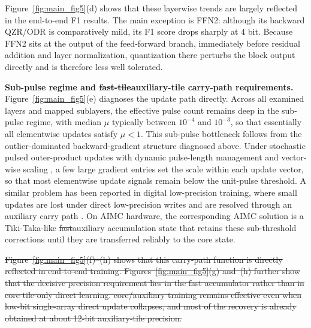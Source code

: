 \documentclass[AMA,LATO2COL]{WileyNJDv5}
\newcommand{\old}[1]{\sout{#1}}
\newcommand{\new}[1]{{\color{red}#1}}
\begin{document}
\noindent
Figure~\ref{fig:main_fig5}(d) shows that these layerwise trends are largely reflected in the end-to-end F1 results. The main exception is FFN2: although its backward QZR/ODR is comparatively mild, its F1 score drops sharply at 4 bit. Because FFN2 sits at the output of the feed-forward branch, immediately before residual addition and layer normalization, quantization there perturbs the block output directly and is therefore less well tolerated.

\noindent\textbf{Sub-pulse regime and \old{fast-tile}\new{auxiliary-tile} carry-path requirements.}
Figure~\ref{fig:main_fig5}(e) diagnoses the update path directly. Across all examined layers and mapped sublayers, the effective pulse count remains deep in the sub-pulse regime, with median \(\mu\) typically between \(10^{-4}\) and \(10^{-3}\), so that essentially all elementwise updates satisfy \(\mu < 1\). This sub-pulse bottleneck follows from the outlier-dominated backward-gradient structure diagnosed above. Under stochastic pulsed outer-product updates with dynamic pulse-length management and vector-wise scaling \cite{rasch2021aihwkit,legallo2023aihwkit}, a few large gradient entries set the scale within each update vector, so that most elementwise update signals remain below the unit-pulse threshold. A similar problem has been reported in digital low-precision training, where small updates are lost under direct low-precision writes and are resolved through an auxiliary carry path \cite{nikdan2026eco}. On AIMC hardware, the corresponding AIMC solution is a Tiki-Taka-like \old{fast}\new{auxiliary} accumulation state that retains these sub-threshold corrections until they are transferred reliably to the core state. 

\noindent
\old{Figure~\ref{fig:main_fig5}(f)--(h) shows that this carry-path function is directly reflected in end-to-end training. Figures~\ref{fig:main_fig5}(g) and~(h) further show that the decisive precision requirement lies in the fast accumulator rather than in core-tile-only direct learning. core/auxiliary training remains effective even when low-bit single-array direct update collapses, and most of the recovery is already obtained at about 12-bit auxiliary-tile precision.}
\end{document}
